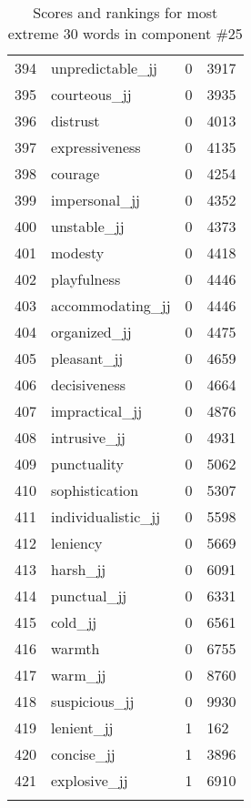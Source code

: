 \begin{longtable}[!htbp]{| rlr@{.}l |}
    394 & unpredictable\_jj & 0 & 3917 \\
    395 & courteous\_jj & 0 & 3935 \\
    396 & distrust & 0 & 4013 \\
    397 & expressiveness & 0 & 4135 \\
    398 & courage & 0 & 4254 \\
    399 & impersonal\_jj & 0 & 4352 \\
    400 & unstable\_jj & 0 & 4373 \\
    401 & modesty & 0 & 4418 \\
    402 & playfulness & 0 & 4446 \\
    403 & accommodating\_jj & 0 & 4446 \\
    404 & organized\_jj & 0 & 4475 \\
    405 & pleasant\_jj & 0 & 4659 \\
    406 & decisiveness & 0 & 4664 \\
    407 & impractical\_jj & 0 & 4876 \\
    408 & intrusive\_jj & 0 & 4931 \\
    409 & punctuality & 0 & 5062 \\
    410 & sophistication & 0 & 5307 \\
    411 & individualistic\_jj & 0 & 5598 \\
    412 & leniency & 0 & 5669 \\
    413 & harsh\_jj & 0 & 6091 \\
    414 & punctual\_jj & 0 & 6331 \\
    415 & cold\_jj & 0 & 6561 \\
    416 & warmth & 0 & 6755 \\
    417 & warm\_jj & 0 & 8760 \\
    418 & suspicious\_jj & 0 & 9930 \\
    419 & lenient\_jj & 1 & 162 \\
    420 & concise\_jj & 1 & 3896 \\
    421 & explosive\_jj & 1 & 6910 \\
    \hline
    \caption{Scores and rankings for most extreme 30 words in component \#25} \\
\end{longtable}

